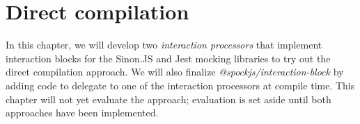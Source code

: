 \chapter{Direct compilation}\label{chap:DirectCompilation}
In this chapter, we will develop
two \textit{interaction processors}
that implement interaction blocks
for the Sinon.JS and Jest mocking libraries
to try out the direct compilation approach.
We will also finalize \textit{@spockjs/interaction-block} by adding code to
delegate to one of the interaction processors at compile time.
This chapter will not yet evaluate the approach;
evaluation is set aside until both approaches have been implemented.












